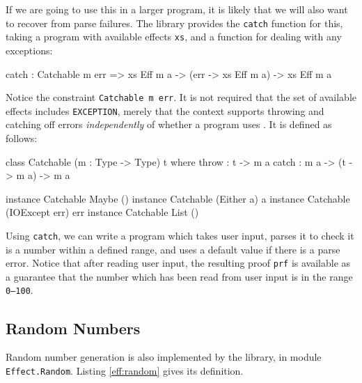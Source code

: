 \noindent
If we are going to use this in a larger program, it is likely that we will also
want to recover from parse failures. The \effects{} library provides the
\texttt{catch} function for this, taking a program with available effects
\texttt{xs}, and a function for dealing with any exceptions:

\begin{code}
catch : Catchable m err => 
        { xs } Eff m a -> (err -> { xs } Eff m a) -> { xs } Eff m a
\end{code}

\noindent
Notice the constraint \texttt{Catchable m err}. It is not required that
the set of available effects includes \texttt{EXCEPTION}, merely that the
context supports throwing and catching off errors \emph{independently} of
whether a program uses \effects{}. It is defined as follows:

\begin{code}
class Catchable (m : Type -> Type) t where
    throw : t -> m a
    catch : m a -> (t -> m a) -> m a

instance Catchable Maybe () 
instance Catchable (Either a) a 
instance Catchable (IOExcept err) err 
instance Catchable List () 
\end{code}

\noindent
Using \texttt{catch}, we can write a program which takes user input, parses
it to check it is a number within a defined range, and uses a default value
if there is a parse error.
%
Notice that after reading user input, the resulting proof \texttt{prf} is
available as a guarantee that the number which has been read from user input
is in the range \texttt{0--100}.



\subsection{Random Numbers}

Random number generation is also implemented by the \effects{} library,
in module \texttt{Effect.Random}. Listing \ref{eff:random} gives its
definition.

